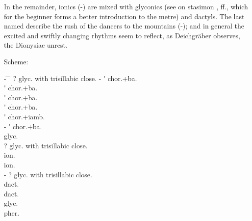 \documentclass[11pt]{report}
\renewcommand{\(}{\begin{metrike}}
\renewcommand{\)}{\end{metrike}}
\begin{document}
In the remainder, ionics (-)
are mixed with glyconics (see on stasimon ,
 ff., which for the beginner forms a
better introduction to the metre) and dactyls. The last
named describe the rush of the dancers to the mountains
(-); and in general the excited and
swiftly changing rhythms seem to reflect, as Deichgr\"aber observes,
the Dionysiac unrest.
\strut\strut\par
Scheme:
\begin{tabbing}
%
%
-\hspace{2em}
\=\metra{\m\b\b\bbm}%
\=\metra{\b\m\s\b\b\m}\hspace{3em}%
\=? glyc. with trisillabic close. \kill
%
-%
\>\>\metra{\m\b\b\m}\'\metra{\b\m\m}%
\>chor{.}+ba.\\
%
\>\>\metra{\m\b\b\m}\'\metra{\b\m\m}%
\>chor{.}+ba.\\
%
\>\>\metra{\bb\b\b\bb}\'\metra{\b\m\m}%
\>chor{.}+ba.\\
%
\>\>\metra{\m\b\b\bbm}\'\metra{\b\m\m}%
\>chor{.}+ba.\\
%
\>\>\metra{\m\b\b\m}\'\metra{\b\m\b\bb}%
\>chor{.}+iamb.\\
%
-%
\>\>\metra{\m\b\b\m}\'\metra{\b\m\m}%
\>chor{.}+ba.\\
%
\>\metra{\m\m\s\m\b\b\m\s\b\m}%
\>\>glyc.\\
%
\>\metra{\bb\b\s\m\b\b\m\s\b\b\m}%
\>\>? glyc. with trisillabic close. \\
%
\>\metra{\m\m\m\s\b\b\m\m\s\b\b\m\m}%
\>\> ion.\\
%
\>\metra{\bb\m\m\s\b\b\m\m\s\b\b\m\m}%
\>\> ion.\\
%
-%
\>\metra{\bb\b\s\m\b\b\m\s\b\b\m}%
\>\>? glyc. with trisillabic close. \\
%
\>\metra{\m\b\b\s\m\b\b\s\m\b\b\s\m\K\m}%
\>\> dact.\\
%
\>\metra{\m\b\b\s\m\b\b}%
\>\> dact.\\
%
\>\metra{\b\m\s\m\b\b\m\s\b\m}%
\>\>glyc.\\
%
\>\metra{\m\m\s\m\b\b\m\s\m}%
\>\>pher.\\
\end{tabbing}
\end{document}
